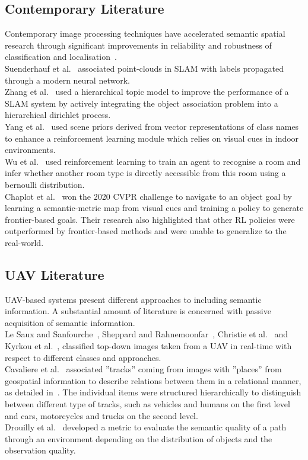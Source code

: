 \documentclass[twocolumn,letterpaper]{IEEEAerospaceCLS}  %
\begin{document}
\subsection{Contemporary Literature} \label{sssec:ResLitCont}
Contemporary image processing techniques have accelerated semantic spatial research through significant improvements in reliability and robustness of classification and localisation~\cite{alom_history_2018}.\\
Suenderhauf et al.~\cite{sunderhauf_meaningful_2017} associated point-clouds in SLAM with labels propagated through a modern neural network.\\
Zhang et al.~\cite{zhang_hierarchical_2019} used a hierarchical topic model to improve the performance of a SLAM system by actively integrating the object association problem into a hierarchical dirichlet process.\\
Yang et al.~\cite{yang_visual_2018} used scene priors derived from vector representations of class names to enhance a reinforcement learning module which relies on visual cues in indoor environments.\\
Wu et al.~\cite{wu_learning_2018} used reinforcement learning to train an agent to recognise a room and infer whether another room type is directly accessible from this room using a bernoulli distribution.\\
Chaplot et al.~\cite{chaplot_object_2020} won the 2020 CVPR challenge to navigate to an object goal by learning a semantic-metric map from visual cues and training a policy to generate frontier-based goals. Their research also highlighted that other RL policies were outperformed by frontier-based methods and were unable to generalize to the real-world.\\
\subsection{UAV Literature} \label{sssec:ResLitUAV}
UAV-based systems present different approaches to including semantic information. A substantial amount of literature is concerned with passive acquisition of semantic information.\\
Le Saux and Sanfourche~\cite{saux_rapid_2013}, Sheppard and Rahnemoonfar~\cite{sheppard_real-time_2017}, Christie et al.~\cite{christie_semantics_2016} and Kyrkou et al.~\cite{kyrkou_dronet:_2018}, classified top-down images taken from a UAV in real-time with respect to different classes and approaches. \\
Cavaliere et al.~\cite{cavaliere_towards_2016,cavaliere_towards_2018} associated ''tracks'' coming from images with ''places'' from geospatial information to describe relations between them in a relational manner, as detailed in~\cite{landsiedel_review_2017}. The individual items were structured hierarchically to distinguish between different type of tracks, such as vehicles and humans on the first level and cars, motorcycles and trucks on the second level.\\
Drouilly et al.~\cite{drouilly_semantic_2015} developed a metric to evaluate the semantic quality of a path through an environment depending on the distribution of objects and the observation quality.
\end{document}
